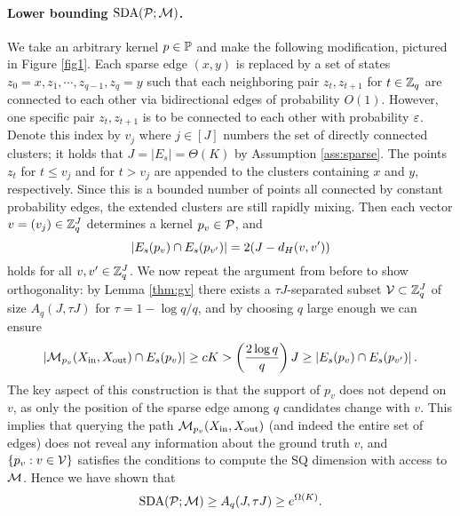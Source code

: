 \paragraph{Lower bounding $\operatorname{SDA}(\mathcal{P};\mathcal{M})$.} We take an arbitrary kernel $p\in\mathbb{P}$ and make the following modification, pictured in Figure \ref{fig1}. Each sparse edge $(x,y)$ is replaced by a set of states $z_0=x,z_1,\cdots,z_{q-1},z_q=y$ such that each neighboring pair $z_t,z_{t+1}$ for $t\in\mathbb{Z}_q$ are connected to each other via bidirectional edges of probability $O(1)$. However, one specific pair $z_t,z_{t+1}$ is to be connected to each other with probability $\varepsilon$. Denote this index by $v_j$ where $j\in [J]$ numbers the set of directly connected clusters; it holds that $J=|E_s|=\Theta(K)$ by Assumption \ref{ass:sparse}. The points $z_t$ for $t\le v_j$ and for $t>v_j$ are appended to the clusters containing $x$ and $y$, respectively. Since this is a bounded number of points all connected by constant probability edges, the extended clusters are still rapidly mixing. Then each vector $v=(v_j)\in \mathbb{Z}_q^J$ determines a kernel $p_v\in \mathcal{P}$, and
\begin{equation*}
\left\lvert E_s(p_v) \cap E_s(p_{v'})\right\rvert =2(J-d_H(v,v'))
\end{equation*}
holds for all $v,v'\in\mathbb{Z}_q^J$. We now repeat the argument from before to show orthogonality: by Lemma \ref{thm:gv} there exists a $\tau J$-separated subset $\mathcal{V}\subset\mathbb{Z}_q^J$ of size $A_q(J,\tau J)$ for $\tau=1-\log q/q$, and by choosing $q$ large enough we can ensure
\begin{equation*}
\left\lvert\mathcal{M}_{p_v}(X_{\operatorname{in}},X_{\operatorname{out}}) \cap E_s(p_v)\right\rvert \ge cK > \left(\frac{2\log q}{q}\right) J \ge \left\lvert E_s(p_v) \cap E_s(p_{v'})\right\rvert.
\end{equation*}
The key aspect of this construction is that the support of $p_v$ does not depend on $v$, as only the position of the sparse edge among $q$ candidates change with $v$. This implies that querying the path $\mathcal{M}_{p_v}(X_{\operatorname{in}},X_{\operatorname{out}})$ (and indeed the entire set of edges) does not reveal any information about the ground truth $v$, and $\{p_v:v\in\mathcal{V}\}$ satisfies the conditions to compute the SQ dimension with access to $\mathcal{M}$. Hence we have shown that
\begin{equation*}
\operatorname{SDA}(\mathcal{P};\mathcal{M}) \ge A_q(J,\tau J) \ge e^{\Omega(K)}.
\end{equation*}


